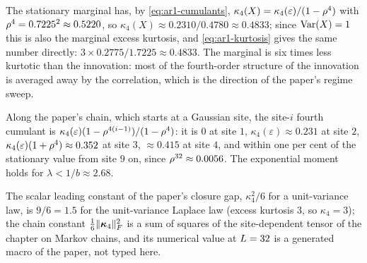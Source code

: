 The stationary marginal has, by \cref{eq:ar1-cumulants}, $\kappa_4(X)=\kappa_4(\varepsilon)/(1-\rho^4)$
with $\rho^4=0.7225^2\approx0.5220$, so $\kappa_4(X)\approx0.2310/0.4780\approx0.4833$;
since $\operatorname{Var}(X)=1$ this is also the marginal excess kurtosis, and \cref{eq:ar1-kurtosis}
gives the same number directly: $3\times0.2775/1.7225\approx0.4833$. The marginal is
six times less kurtotic than the innovation: most of the fourth-order structure of the
innovation is averaged away by the correlation, which is the direction of the paper's
regime sweep.

Along the paper's chain, which starts at a Gaussian site, the site-$i$ fourth cumulant
is $\kappa_4(\varepsilon)(1-\rho^{4(i-1)})/(1-\rho^4)$: it is $0$ at site $1$,
$\kappa_4(\varepsilon)\approx0.231$ at site $2$, $\kappa_4(\varepsilon)(1+\rho^4)\approx0.352$
at site $3$, $\approx0.415$ at site $4$, and within one per cent of the stationary
value from site $9$ on, since $\rho^{32}\approx0.0056$. The exponential moment holds
for $\lambda<1/b\approx2.68$.

The scalar leading constant of the paper's closure gap, $\kappa_4^2/6$ for a unit-variance
law, is $9/6=1.5$ for the unit-variance Laplace law (excess kurtosis $3$, so
$\kappa_4=3$); the chain constant $\tfrac16\lVert \bm{\kappa}_4 \rVert_{F}^2$ is a sum of squares of the
site-dependent tensor of the chapter on Markov chains, and its numerical value at
$L=32$ is a generated macro of the paper, not typed here.


